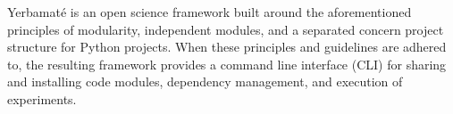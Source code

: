 


Yerbamaté is an open science framework built around the aforementioned principles of modularity, independent modules, and a separated concern project structure for Python projects. When these principles and guidelines are adhered to, the resulting framework provides a command line interface (CLI) for sharing and installing code modules, dependency management, and execution of experiments. 




